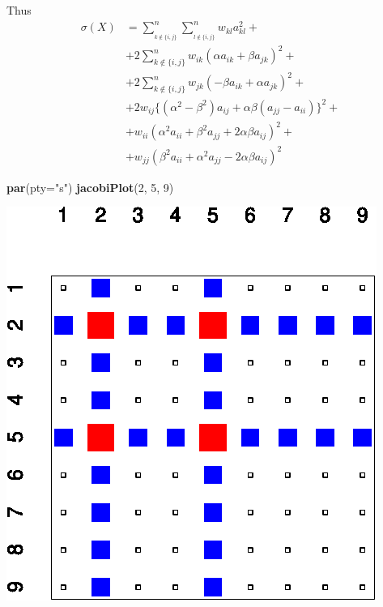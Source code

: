 \documentclass[
  12pt,
]{article}
\newenvironment{Shaded}{\begin{snugshade}}{\end{snugshade}}
\newcommand{\AttributeTok}[1]{\textcolor[rgb]{0.13,0.29,0.53}{#1}}
\newcommand{\DecValTok}[1]{\textcolor[rgb]{0.00,0.00,0.81}{#1}}
\newcommand{\FunctionTok}[1]{\textcolor[rgb]{0.13,0.29,0.53}{\textbf{#1}}}
\newcommand{\NormalTok}[1]{#1}
\newcommand{\StringTok}[1]{\textcolor[rgb]{0.31,0.60,0.02}{#1}}
\begin{document}
Thus
\begin{align}
\sigma(X)&=\sum_{_{k\not\in\{i,j\}}}^n\sum_{_{l\not\in\{i,j\}}}^nw_{kl}^{\ }a_{kl}^2+\\
&+2\sum_{k\not\in\{i,j\}}^nw_{ik}(\alpha a_{ik}+\beta a_{jk})^2+\\
&+2\sum_{k\not\in\{i,j\}}^nw_{jk}(-\beta a_{ik}+\alpha a_{jk})^2+\\
&+2w_{ij}\{(\alpha^2-\beta^2)a_{ij}+\alpha\beta(a_{jj}-a_{ii})\}^2+\\
&+w_{ii}(\alpha^2a_{ii}+\beta^2a_{jj}+2\alpha\beta a_{ij})^2+\\
&+w_{jj}(\beta^2a_{ii}+\alpha^2a_{jj}-2\alpha\beta a_{ij})^2
\end{align}

\begin{Shaded}
\begin{Highlighting}[]
\FunctionTok{par}\NormalTok{(}\AttributeTok{pty=}\StringTok{"s"}\NormalTok{)}
\FunctionTok{jacobiPlot}\NormalTok{(}\DecValTok{2}\NormalTok{, }\DecValTok{5}\NormalTok{, }\DecValTok{9}\NormalTok{)}
\end{Highlighting}
\end{Shaded}

\begin{center}\includegraphics{wJacobi_files/figure-latex/figjacobi-1} \end{center}
\end{document}

